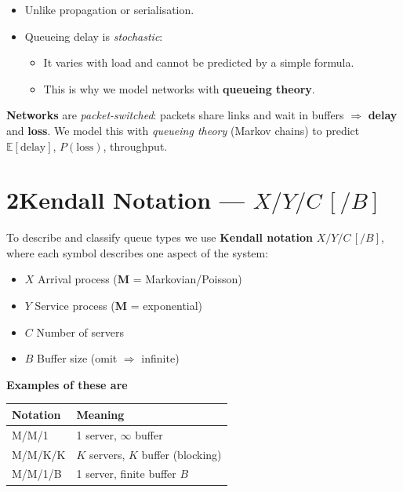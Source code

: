 \documentclass[10pt,a4paper]{article}
\begin{document}
\vspace{3pt}
\begin{keybox}
  \begin{itemize}
    \item Unlike propagation or serialisation.
    \item Queueing delay is \emph{stochastic}:
    \begin{itemize}
    \item It varies with load and cannot be predicted by a simple formula. 
    \item This is why we model networks with \textbf{queueing theory}.
    \end{itemize} 
  \end{itemize}
\end{keybox}
\begin{notebox}
\textbf{Networks} are \emph{packet-switched}: packets share links and wait in
buffers $\Rightarrow$ \textbf{delay} and \textbf{loss}. We model this with
\emph{queueing theory} (Markov chains) to predict $\mathbb{E}[\text{delay}]$,
$P(\text{loss})$, throughput.
\end{notebox}
\section*{2\quad Kendall Notation --- $X/Y/C\,[/B]$}
To describe and classify queue types we use \textbf{Kendall notation} $X/Y/C\,[/B]$, where each symbol describes one aspect of the system:\\
\begin{minipage}[t]{0.52\textwidth}
\begin{defbox}
\begin{itemize}
  \item $X$ \textemdash{} Arrival process \quad (\textbf{M} = Markovian/Poisson)
  \item $Y$ \textemdash{} Service process \quad (\textbf{M} = exponential)
  \item $C$ \textemdash{} Number of servers
  \item $B$ \textemdash{} Buffer size (omit $\Rightarrow$ infinite)
\end{itemize}
\end{defbox}
\end{minipage}\hfill
\begin{minipage}[t]{0.45\textwidth}
  \begin{notebox}
    \textbf{Examples of these are} \\
\begin{tabular}{@{}ll@{}}
\toprule
Notation & Meaning \\\midrule
M/M/1 & 1 server, $\infty$ buffer \\
M/M/K/K & $K$ servers, $K$ buffer (blocking) \\
M/M/1/B & 1 server, finite buffer $B$ \\
\bottomrule
\end{tabular}
  \end{notebox}
\end{minipage}
\end{document}

